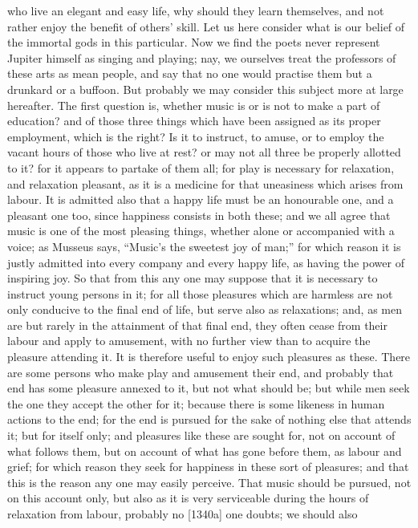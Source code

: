 who live an elegant and easy life, why should they learn themselves, and
not rather enjoy the benefit of others' skill. Let us here consider what
is our belief of the immortal gods in this particular. Now we find the
poets never represent Jupiter himself as singing and playing; nay, we
ourselves treat the professors of these arts as mean people, and say that
no one would practise them but a drunkard or a buffoon. But probably we
may consider this subject more at large hereafter. The first question is,
whether music is or is not to make a part of education? and of those three
things which have been assigned as its proper employment, which is the
right? Is it to instruct, to amuse, or to employ the vacant hours of those
who live at rest? or may not all three be properly allotted to it? for it
appears to partake of them all; for play is necessary for relaxation, and
relaxation pleasant, as it is a medicine for that uneasiness which arises
from labour. It is admitted also that a happy life must be an honourable
one, and a pleasant one too, since happiness consists in both these; and
we all agree that music is one of the most pleasing things, whether alone
or accompanied with a voice; as Musseus says, ``Music's the sweetest joy of
man;'' for which reason it is justly admitted into every company and every
happy life, as having the power of inspiring joy. So that from this any
one may suppose that it is necessary to instruct young persons in it; for
all those pleasures which are harmless are not only conducive to the final
end of life, but serve also as relaxations; and, as men are but rarely in
the attainment of that final end, they often cease from their labour and
apply to amusement, with no further view than to acquire the pleasure
attending it. It is therefore useful to enjoy such pleasures as these.
There are some persons who make play and amusement their end, and probably
that end has some pleasure annexed to it, but not what should be; but
while men seek the one they accept the other for it; because there is some
likeness in human actions to the end; for the end is pursued for the sake
of nothing else that attends it; but for itself only; and pleasures like
these are sought for, not on account of what follows them, but on account
of what has gone before them, as labour and grief; for which reason they
seek for happiness in these sort of pleasures; and that this is the reason
any one may easily perceive. That music should be pursued, not on this
account only, but also as it is very serviceable during the hours of
relaxation from labour, probably no [1340a] one doubts; we should also
